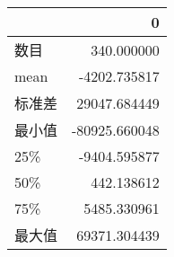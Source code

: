 \begin{tabular}{lr}
\toprule
{} &             0 \\
\midrule
数目 &    340.000000 \\
mean  &  -4202.735817 \\
标准差   &  29047.684449 \\
最小值   & -80925.660048 \\
25\%   &  -9404.595877 \\
50\%   &    442.138612 \\
75\%   &   5485.330961 \\
最大值   &  69371.304439 \\
\bottomrule
\end{tabular}
